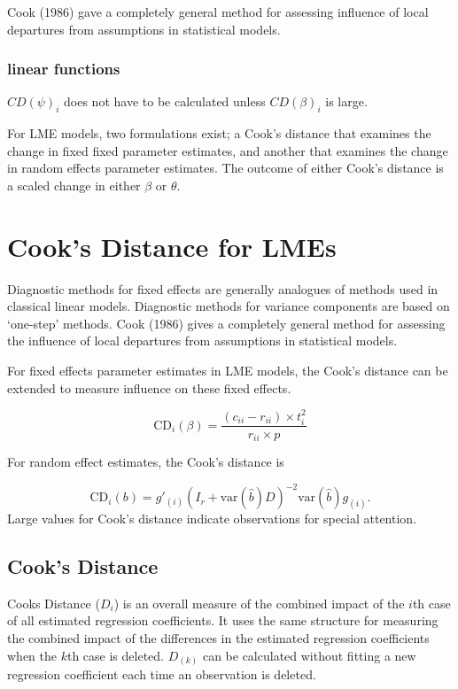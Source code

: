 \documentclass[12pt, a4paper]{article}
\begin{document}
Cook (1986) gave a completely general method for assessing influence of local departures from
assumptions in statistical models.


\subsubsection{linear functions}

$CD(\psi)_i$ does not have to be calculated unless $CD(\beta)_i$ is large.

%

For LME models, two formulations exist; a Cook's distance that examines the change in fixed fixed parameter estimates, and another that examines the change in random effects parameter estimates. The outcome of either Cook's distance is a scaled change in either $\beta$ or $\theta$.



\section{Cook's Distance for LMEs} %
Diagnostic methods for fixed effects are generally analogues of methods used in classical linear models.
Diagnostic methods for variance components are based on `one-step' methods. Cook (1986) gives a completely general method for assessing the influence of local departures from assumptions in statistical models.

For fixed effects parameter estimates in LME models, the  Cook's distance can be extended to measure influence on these fixed effects.

\[
\mbox{CD}_{i}(\beta) = \frac{(c_{ii} - r_{ii}) \times t^2_{i}}{r_{ii} \times p}
\]

For random effect estimates, the  Cook's distance is

\[
\mbox{CD}_{i}(b) = g{\prime}_{(i)} (I_{r} + \mbox{var}(\hat{b})D)^{-2}\mbox{var}(\hat{b})g_{(i)}.
\]
Large values for Cook's distance indicate observations for special attention.



\subsection{Cook's Distance}%
Cooks Distance ($D_{i}$) is an overall measure of the combined impact of the $i$th case of all estimated regression coefficients. It uses the same structure for measuring the combined impact of the differences in the estimated regression coefficients when the $k$th case is deleted. $D_{(k)}$ can be calculated without fitting
a new regression coefficient each time an observation is deleted.
\end{document}
